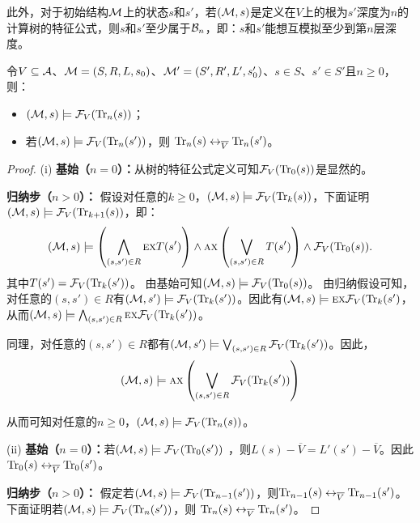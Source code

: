 此外，对于初始结构${\cal M}$上的状态$s$和$s'$，若$({\cal M},s)$是定义在$V$上的根为$s'$深度为$n$的计算树的特征公式，则$s$和$s'$至少属于${\cal B}_n$，即：$s$和$s'$能想互模拟至少到第$n$层深度。

\begin{lemma}\label{Bn:to:Tn}
	令$V\subseteq {\cal A}$、${\cal M}=(S, R, L,s_0)$、${\cal M}'=(S', R', L',s_0')$、$s\in S$、$s'\in S'$且$n\ge 0$，则：
	\begin{itemize}
		\item[(i)] $({\cal M},s)\models{\cal F}_V(\textrm{Tr}_n(s))$；
		\item[(ii)] 若$({\cal M},s)\models{\cal F}_V(\textrm{Tr}_n(s'))$，则
		$\textrm{Tr}_n(s) \leftrightarrow_{\overline V} \textrm{Tr}_n(s')$。
	\end{itemize}
\end{lemma}
\begin{proof}
	(i) \textbf{基始（$n=0$）：}从树的特征公式定义可知${\cal F}_V(\textrm{Tr}_0(s))$是显然的。

	\textbf{归纳步（$n>0$）：} 假设对任意的$k\geq 0$，$({\cal M},s)\models{\cal F}_V(\textrm{Tr}_k(s))$，下面证明$({\cal M},s)\models{\cal F}_V(\textrm{Tr}_{k+1}(s))$，即：
	\begin{equation*}
		({\cal M},s)\models \left(\bigwedge_{(s,s')\in R}
		\textsc{e} \textsc{x} T(s')\right)
		\wedge \textsc{a} \textsc{x}\left(\bigvee_{(s,s')\in R}
		T(s')\right)
		\wedge {\cal F}_V(\textrm{Tr}_0(s)).
	\end{equation*}
	其中$T(s') ={\cal F}_V(\textrm{Tr}_k(s'))$。 
	由基始可知$({\cal M},s)\models {\cal F}_V(\textrm{Tr}_0(s))$。
	由归纳假设可知，对任意的$(s,s') \in R$有$({\cal M}, s') \models {\cal F}_V(\textrm{Tr}_k(s'))$。因此有$({\cal M},s)\models \textsc{e} \textsc{x} {\cal F}_V(\textrm{Tr}_k(s')$，从而$({\cal M},s)\models \bigwedge_{(s,s')\in R}
	\textsc{e} \textsc{x} {\cal F}_V(\textrm{Tr}_k(s'))$。
	
	同理，对任意的$(s,s') \in R$都有$({\cal M}, s') \models \bigvee_{(s,s')\in R} {\cal F}_V(\textrm{Tr}_k(s') )$。因此，
	$$({\cal M},s)\models \textsc{a} \textsc{x}\left(\bigvee_{(s,s')\in R}
	{\cal F}_V(\textrm{Tr}_k(s') )\right)$$
	
	从而可知对任意的$n\geq 0$，$({\cal M},s)\models{\cal F}_V(\textrm{Tr}_n(s))$。
	
	
	
	(ii) \textbf{基始（$n=0$）：}若$({\cal M}, s)  \models {\cal F}_V(\textrm{Tr}_0(s'))$ ，则$L(s) - \overline V = L'(s') - \overline V$。因此$\textrm{Tr}_0(s) \leftrightarrow_{\overline V} \textrm{Tr}_0(s')$。
	
	\textbf{归纳步（$n>0$）：} 假定若$({\cal M},s)\models{\cal F}_V(\textrm{Tr}_{n-1}(s'))$，则$\textrm{Tr}_{n-1}(s) \leftrightarrow_{\overline V} \textrm{Tr}_{n-1}(s')$。下面证明若$({\cal M},s)\models{\cal F}_V(\textrm{Tr}_n(s'))$，则
	$\textrm{Tr}_n(s) \leftrightarrow_{\overline V} \textrm{Tr}_n(s')$。
	

\end{proof}
